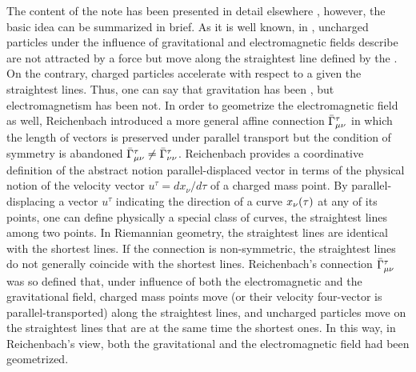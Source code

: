 \documentclass[draft]{article}
\newcommand{\ap}{\ensuremath{\tau}\xspace}
\newcommand{\dap}{\ensuremath{d\ap}\xspace}
\newcommand{\Gtmnbar}{\ensuremath{\bar{\Gamma}\tmn}\xspace}
\begin{document}
The content of the note has been presented in detail elsewhere \citep{Giovanelli2016}, however, the basic idea can be summarized in brief. As it is well known, in \gr, uncharged particles under the influence of gravitational and electromagnetic fields describe are not attracted by a force but move along the straightest line defined by the \Gtmn. On the contrary, charged particles accelerate with respect to a given the straightest lines. Thus, one can say that gravitation has been , but electromagnetism has been not. In order to geometrize the electromagnetic field as well, Reichenbach introduced a more general affine connection \Gtmnbar in which the length of vectors is preserved under parallel transport but the condition of symmetry is abandoned $\Gtmnbar \neq \bar{\Gamma}^\tau_{\nu\nu}$. Reichenbach provides a coordinative definition of the abstract notion parallel-displaced vector in terms of the physical notion of the velocity vector $u^\tau=dx_\nu/\dap$ of a charged mass point. By parallel-displacing a vector $u^\tau$ indicating the direction of a curve $\xn(\ap)$ at any of its points, one can define physically a special class of curves, the straightest lines among two points. In Riemannian geometry, the straightest lines are identical with the shortest lines. If the connection is non-symmetric, the straightest lines do not generally coincide with the shortest lines. Reichenbach's connection \Gtmnbar was so defined that, under influence of both the electromagnetic and the gravitational field, charged mass points move (or their velocity four-vector is parallel-transported) along the straightest lines, and uncharged particles move on the straightest lines that are at the same time the shortest ones. In this way, in Reichenbach's view, both the gravitational and the electromagnetic field had been geometrized.
\end{document}
